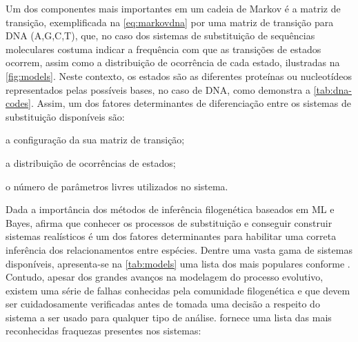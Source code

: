 \documentclass[english,brazilian]{UNISINOSmonografia} %
\begin{document}
Um dos componentes mais importantes em um cadeia de Markov é a matriz de transição, exemplificada na \autoref{eq:markovdna} por uma matriz de transição para DNA (A,G,C,T), que, no caso dos sistemas de substituição de sequências moleculares costuma indicar a frequência com que as transições de estados ocorrem, assim como a distribuição de ocorrência de cada estado, ilustradas na \autoref{fig:models}.
Neste contexto, os estados são as diferentes proteínas ou nucleotídeos representados pelas possíveis bases, no caso de DNA, como demonstra a \autoref{tab:dna-codes}.
Assim, um dos fatores determinantes de diferenciação entre os sistemas de substituição disponíveis são: 
\begin{inparaenum} 
	\item a configuração da sua matriz de transição;
	\item a distribuição de ocorrências de estados;
	\item o número de parâmetros livres utilizados no sistema.
\end{inparaenum}


%
%

Dada a importância dos métodos de inferência filogenética baseados em ML e Bayes,  afirma que conhecer os processos de substituição e conseguir construir sistemas realísticos é um dos fatores determinantes para habilitar uma correta inferência dos relacionamentos entre espécies.
Dentre uma vasta gama de sistemas disponíveis, apresenta-se na \autoref{tab:models} uma lista dos mais populares conforme .
Contudo, apesar dos grandes avanços na modelagem do processo evolutivo, existem uma série de falhas conhecidas pela comunidade filogenética e que devem ser cuidadosamente verificadas antes de tomada uma decisão a respeito do sistema a ser usado para qualquer tipo de análise.
 fornece uma lista das mais reconhecidas fraquezas presentes nos sistemas:
\end{document}
